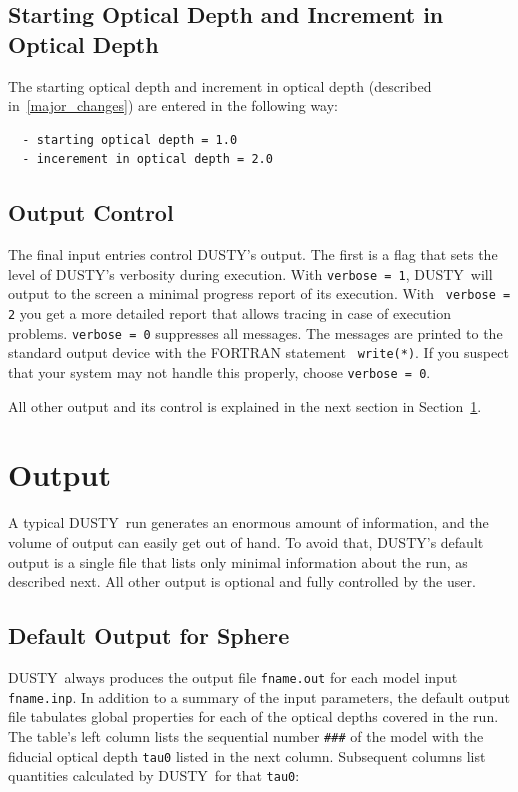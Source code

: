\documentclass[11pt]{article}
\def\D  {{\sf DUSTY}}
\begin{document}
\subsection{Starting Optical Depth and Increment in Optical Depth}
\label{starting_opt_depth}

The starting optical depth and increment in optical depth (described
in~\ref{major_changes}) are entered in the following way:
%
\begin{verbatim}
  - starting optical depth = 1.0
  - incerement in optical depth = 2.0
\end{verbatim}


\subsection{Output Control}

The final input entries control \D's output. The first is a flag that sets the
level of \D's verbosity during execution.  With {\tt verbose = 1}, \D\ will
output to the screen a minimal progress report of its execution. With {\tt
verbose = 2} you get a more detailed report that allows tracing in case of
execution problems. {\tt verbose = 0} suppresses all messages.  The messages
are printed to the standard output device with the FORTRAN statement {\tt
write(*)}.  If you suspect that your system may not handle this properly,
choose {\tt verbose = 0}.

All other output and its control is explained in the next section in
Section~\ref{output}.


\section{Output}
\label{output}

A typical \D\ run generates an enormous amount of information, and the volume
of output can easily get out of hand. To avoid that, \D's default output is a
single file that lists only minimal information about the run, as described
next. All other output is optional and fully controlled by the user.


\subsection{Default Output for Sphere}
\label{default_sph}

\D\ always produces the output file {\tt fname.out} for each model input {\tt
fname.inp}. In addition to a summary of the input parameters, the default
output file tabulates global properties for each of the optical depths covered
in the run. The table's left column lists the sequential number {\tt \#\#\#} of
the model with the fiducial optical depth {\tt tau0} listed in the next column.
Subsequent columns list quantities calculated by \D\ for that {\tt tau0}:
\end{document}
